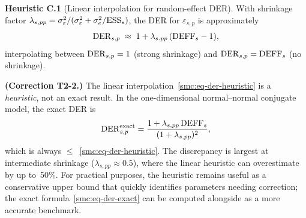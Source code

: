 
\noindent
\textbf{Heuristic C.1} (Linear interpolation for random-effect DER).
\label{smc:heuristic-der-re}%
With shrinkage factor
$\lambda_{s,pp}
= \sigma_\varepsilon^2 / (\sigma_\varepsilon^2 + \sigma_e^2 / \text{ESS}_s)$,
the DER for $\varepsilon_{s,p}$ is approximately
\begin{equation}\label{smc:eq-der-heuristic}
  \operatorname{DER}_{s,p}
  \;\approx\;
  1 + \lambda_{s,pp}\,(\text{DEFF}_s - 1),
\end{equation}
interpolating between $\operatorname{DER}_{s,p} = 1$ (strong shrinkage) and
$\operatorname{DER}_{s,p} = \text{DEFF}_s$ (no shrinkage).

\begin{remark}
\label{smc:rem-heuristic-overestimate}
  {\upshape\textbf{(Correction T2-2.)}}
  The linear interpolation~\eqref{smc:eq-der-heuristic} is a
  \emph{heuristic}, not an exact result.  In the one-dimensional
  normal--normal conjugate model, the exact DER is
  \begin{equation}\label{smc:eq-der-exact}
    \operatorname{DER}_{s,p}^{\textup{exact}}
    = \frac{1 + \lambda_{s,pp}\,\text{DEFF}_s}
           {(1 + \lambda_{s,pp})^2},
  \end{equation}
  which is always $\leq$~\eqref{smc:eq-der-heuristic}.  The
  discrepancy is largest at intermediate shrinkage
  ($\lambda_{s,pp} \approx 0.5$), where the linear heuristic can
  overestimate by up to~50\%.  For practical purposes, the heuristic
  remains useful as a conservative upper bound that quickly
  identifies parameters needing correction; the exact
  formula~\eqref{smc:eq-der-exact} can be computed alongside as a
  more accurate benchmark.
\end{remark}


